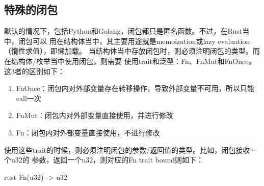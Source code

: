 \subsection{特殊的闭包}
默认的情况下，包括Python和Golang，闭包都只是匿名函数。不过，在Rust当中，闭包可以
用在结构体当中，其主要用途就是memoization或lazy evaluation（惰性求值），即懒加载。
当结构体当中存放闭包时，则必须注明闭包的类型。而在结构体/枚举当中使用闭包，则需要
使用trait和泛型：Fn、FnMut和FnOnce。这3者的区别如下：
\begin{enumerate}
  \item FnOnce：闭包内对外部变量存在转移操作，导致外部变量不可用，所以只能call一次
  \item FnMut：闭包内对外部变量直接使用，并进行修改
  \item Fn：闭包内对外部变量直接使用，不进行修改
\end{enumerate}

使用这些trait的时候，则必须注明闭包的参数/返回值的类型。比如，闭包接收一个u32的
参数，返回一个u32，则对应的Fn trait bound则如下：
\begin{code-block}{rust}
Fn(u32) -> u32
\end{code-block}

